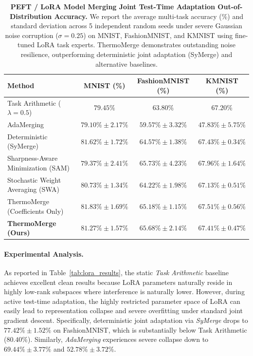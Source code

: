 \begin{table}[t]
\caption{\textbf{PEFT / LoRA Model Merging Joint Test-Time Adaptation Out-of-Distribution Accuracy.} We report the average multi-task accuracy (\%) and standard deviation across 5 independent random seeds under severe Gaussian noise corruption ($\sigma=0.25$) on MNIST, FashionMNIST, and KMNIST using fine-tuned LoRA task experts. ThermoMerge demonstrates outstanding noise resilience, outperforming deterministic joint adaptation (SyMerge) and alternative baselines.}
\label{tab:lora_ood_results}
\vskip 0.15in
\begin{center}
\begin{small}
\begin{sc}
\begin{tabular}{lccc}
\toprule
Method & MNIST (\%) & FashionMNIST (\%) & KMNIST (\%) \\
\midrule
Task Arithmetic ($\lambda=0.5$) & $79.45\%$ & $63.80\%$ & $67.20\%$ \\
AdaMerging~\cite{yang2024adamerging} & $79.10\% \pm 2.17\%$ & $59.57\% \pm 3.32\%$ & $47.83\% \pm 5.75\%$ \\
Deterministic (SyMerge) & $81.62\% \pm 1.72\%$ & $64.57\% \pm 1.38\%$ & $67.43\% \pm 0.34\%$ \\
Sharpness-Aware Minimization (SAM) & $79.37\% \pm 2.41\%$ & $65.73\% \pm 4.23\%$ & $\mathbf{67.96\% \pm 1.64\%}$ \\
Stochastic Weight Averaging (SWA) & $80.73\% \pm 1.34\%$ & $64.22\% \pm 1.98\%$ & $67.13\% \pm 0.51\%$ \\
ThermoMerge (Coefficients Only) & $\mathbf{81.83\% \pm 1.69\%}$ & $65.18\% \pm 1.15\%$ & $67.51\% \pm 0.56\%$ \\
\textbf{ThermoMerge (Ours)} & $81.27\% \pm 1.57\%$ & $\mathbf{65.68\% \pm 2.14\%}$ & $67.41\% \pm 0.47\%$ \\
\bottomrule
\end{tabular}
\end{sc}
\end{small}
\end{center}
\vskip -0.1in
\end{table}

\paragraph{Experimental Analysis.}
As reported in Table~\ref{tab:lora_results}, the static \emph{Task Arithmetic} baseline achieves excellent clean results because LoRA parameters naturally reside in highly low-rank subspaces where interference is naturally lower.
However, during active test-time adaptation, the highly restricted parameter space of LoRA can easily lead to representation collapse and severe overfitting under standard joint gradient descent.
Specifically, deterministic joint adaptation via \emph{SyMerge} drops to $77.42\% \pm 1.52\%$ on FashionMNIST, which is substantially below Task Arithmetic ($80.40\%$).
Similarly, \emph{AdaMerging} experiences severe collapse down to $69.44\% \pm 3.77\%$ and $52.78\% \pm 3.72\%$.

